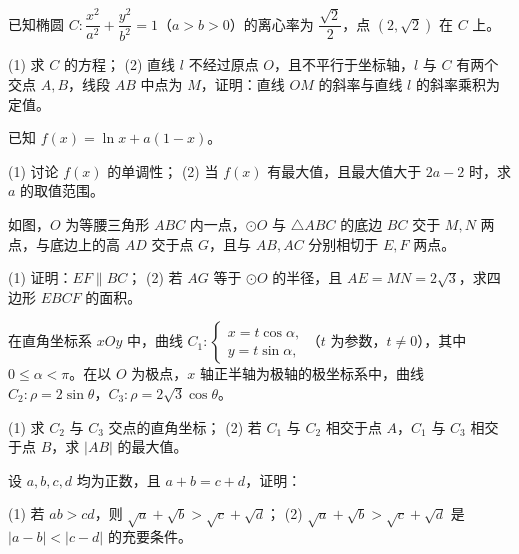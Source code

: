 \begin{question}
已知椭圆 $C:\dfrac{x^2}{a^2}+\dfrac{y^2}{b^2}=1$（$a>b>0$）的离心率为 $\dfrac{\sqrt2}2$，点 $(2,\sqrt2)$ 在 $C$ 上。

(1) 求 $C$ 的方程；  
(2) 直线 $l$ 不经过原点 $O$，且不平行于坐标轴，$l$ 与 $C$ 有两个交点 $A,B$，线段 $AB$ 中点为 $M$，证明：直线 $OM$ 的斜率与直线 $l$ 的斜率乘积为定值。

\end{question}
\begin{question}
已知 $f(x)=\ln x+a(1-x)$。

(1) 讨论 $f(x)$ 的单调性；  
(2) 当 $f(x)$ 有最大值，且最大值大于 $2a-2$ 时，求 $a$ 的取值范围。

\Needspace{0.4\textheight}
\end{question}
\begin{question}
如图，$O$ 为等腰三角形 $ABC$ 内一点，$\odot O$ 与 $\triangle ABC$ 的底边 $BC$ 交于 $M,N$ 两点，与底边上的高 $AD$ 交于点 $G$，且与 $AB,AC$ 分别相切于 $E,F$ 两点。

(1) 证明：$EF\parallel BC$；  
(2) 若 $AG$ 等于 $\odot O$ 的半径，且 $AE=MN=2\sqrt3$，求四边形 $EBCF$ 的面积。
\nopagebreak[4]
\begin{center}\end{center}
\nopagebreak[4]
\end{question}
\begin{question}
在直角坐标系 $xOy$ 中，曲线 $C_1:\begin{cases}x=t\cos\alpha,\\y=t\sin\alpha,\end{cases}$（$t$ 为参数，$t\ne0$），其中 $0\le\alpha<\pi$。在以 $O$ 为极点，$x$ 轴正半轴为极轴的极坐标系中，曲线 $C_2:\rho=2\sin\theta$，$C_3:\rho=2\sqrt3\cos\theta$。

(1) 求 $C_2$ 与 $C_3$ 交点的直角坐标；  
(2) 若 $C_1$ 与 $C_2$ 相交于点 $A$，$C_1$ 与 $C_3$ 相交于点 $B$，求 $|AB|$ 的最大值。

\end{question}
\begin{question}
设 $a,b,c,d$ 均为正数，且 $a+b=c+d$，证明：

(1) 若 $ab>cd$，则 $\sqrt a+\sqrt b>\sqrt c+\sqrt d$；  
(2) $\sqrt a+\sqrt b>\sqrt c+\sqrt d$ 是 $|a-b|<|c-d|$ 的充要条件。

\end{question}